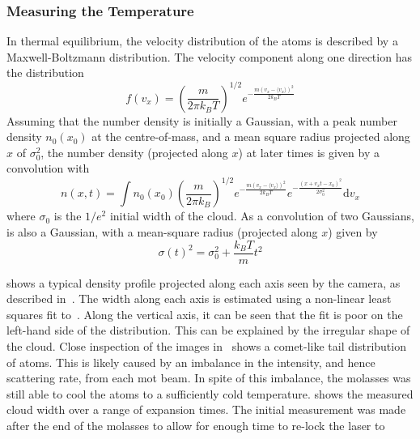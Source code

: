 \subsubsection{Measuring the Temperature}
In thermal equilibrium, the velocity distribution of the atoms is
described by a Maxwell-Boltzmann distribution. The velocity
component along one direction has the distribution
\begin{equation}
  f(v_x) = \left(\frac{m}{2\pi k_B T}\right)^{1/2}e^{-\frac{m (v_x-\langle v_x \rangle) ^2}{2 k_B T}}
  \label{eq:mb1D}
\end{equation}
Assuming that the number density is initially a Gaussian, with a peak
number density \(n_0(x_0)\) at the centre-of-mass,
and a mean square radius projected along $x$ of $\sigma_0^2$, the
number density (projected along $x$)
at later times is given by a convolution with~
\begin{equation}
  n(x,t) = \int n_0(x_0) \left(\frac{m}{2\pi k_B}\right)^{1/2} e^{-\frac{m (v_x-\langle v_x \rangle)^2}{2 k_B T}} e^{-\frac{(x+v_x t - x_0)^2}{2\sigma_0^2}} \mathrm{d}v_x
  \label{eq:density_time}
\end{equation}
where \(\sigma_0\) is the \(1/e^2\) initial width of the cloud. As a
convolution of two Gaussians,  is also a
Gaussian, with a mean-square radius (projected along $x$) given by
\begin{equation}
  \sigma(t)^2 = \sigma_0^2 + \frac{k_B T}{m} t^2
  \label{eq:expansion_width}
\end{equation}
\par\noindent
{} shows a typical density
profile projected along each axis seen by the camera,
as described in~. The width along each
axis is estimated using a non-linear least squares fit
to~. Along the vertical axis, it can be
seen that the fit is poor on the left-hand side of the distribution.
This can be explained by the irregular shape of the cloud. Close
inspection of the images in~ shows a
comet-like tail distribution of atoms. This is likely caused by an
imbalance in the intensity, and hence scattering rate, from each
\ac{mot} beam. In spite of this imbalance, the molasses was still able
to cool the atoms to a sufficiently cold temperature.
 shows the measured cloud width
over a range of expansion times. The
initial measurement was made  after the end
of the molasses to allow for enough time to re-lock the laser to

